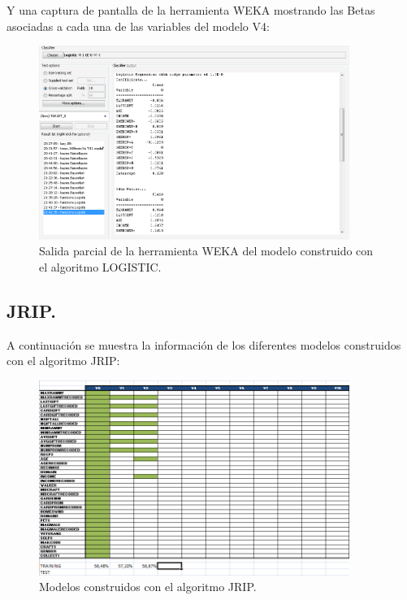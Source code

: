 Y una captura de pantalla de la herramienta WEKA mostrando las Betas asociadas a cada una de las variables del modelo V4:

\begin{figure}[H]
\begin{center}
\includegraphics[width=0.9\textwidth]{img/logistic-1}
\caption{Salida parcial de la herramienta WEKA del modelo construido con el algoritmo LOGISTIC.}
\end{center}
\end{figure}

\subsection{JRIP.}

A continuación se muestra la información de los diferentes modelos construidos con el algoritmo JRIP:

\begin{figure}[H]
\begin{center}
\includegraphics[width=0.9\textwidth]{img/jrip-2}
\caption{Modelos construidos con el algoritmo JRIP.}
\end{center}
\end{figure}

